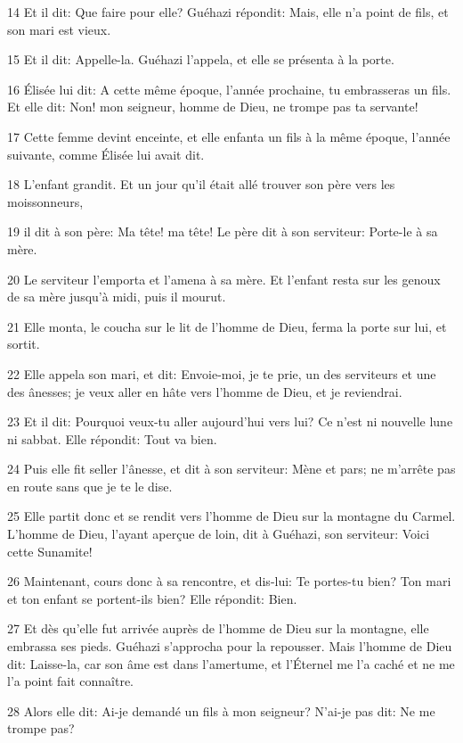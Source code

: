 \par 14 Et il dit: Que faire pour elle? Guéhazi répondit: Mais, elle n'a point de fils, et son mari est vieux.
\par 15 Et il dit: Appelle-la. Guéhazi l'appela, et elle se présenta à la porte.
\par 16 Élisée lui dit: A cette même époque, l'année prochaine, tu embrasseras un fils. Et elle dit: Non! mon seigneur, homme de Dieu, ne trompe pas ta servante!
\par 17 Cette femme devint enceinte, et elle enfanta un fils à la même époque, l'année suivante, comme Élisée lui avait dit.
\par 18 L'enfant grandit. Et un jour qu'il était allé trouver son père vers les moissonneurs,
\par 19 il dit à son père: Ma tête! ma tête! Le père dit à son serviteur: Porte-le à sa mère.
\par 20 Le serviteur l'emporta et l'amena à sa mère. Et l'enfant resta sur les genoux de sa mère jusqu'à midi, puis il mourut.
\par 21 Elle monta, le coucha sur le lit de l'homme de Dieu, ferma la porte sur lui, et sortit.
\par 22 Elle appela son mari, et dit: Envoie-moi, je te prie, un des serviteurs et une des ânesses; je veux aller en hâte vers l'homme de Dieu, et je reviendrai.
\par 23 Et il dit: Pourquoi veux-tu aller aujourd'hui vers lui? Ce n'est ni nouvelle lune ni sabbat. Elle répondit: Tout va bien.
\par 24 Puis elle fit seller l'ânesse, et dit à son serviteur: Mène et pars; ne m'arrête pas en route sans que je te le dise.
\par 25 Elle partit donc et se rendit vers l'homme de Dieu sur la montagne du Carmel. L'homme de Dieu, l'ayant aperçue de loin, dit à Guéhazi, son serviteur: Voici cette Sunamite!
\par 26 Maintenant, cours donc à sa rencontre, et dis-lui: Te portes-tu bien? Ton mari et ton enfant se portent-ils bien? Elle répondit: Bien.
\par 27 Et dès qu'elle fut arrivée auprès de l'homme de Dieu sur la montagne, elle embrassa ses pieds. Guéhazi s'approcha pour la repousser. Mais l'homme de Dieu dit: Laisse-la, car son âme est dans l'amertume, et l'Éternel me l'a caché et ne me l'a point fait connaître.
\par 28 Alors elle dit: Ai-je demandé un fils à mon seigneur? N'ai-je pas dit: Ne me trompe pas?
